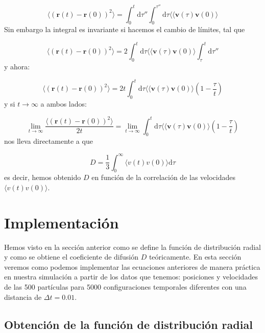 \documentclass[11pt]{article} %
\newcommand{\parentesis}[1]{\left( #1  \right)}
\newcommand{\D}{\mathrm{d}}
\newcommand{\rn}{\mathbf{r}}
\newcommand{\vn}{\mathbf{v}}
\begin{document}
\begin{equation}
	\langle	(\rn(t)-\rn(0))^2 \rangle = \int_{0}^{t}\D \tau'' \int_{0}^{\tau''} \D \tau  \langle \langle	\vn(\tau) \vn(0) \rangle 
\end{equation}
Sin embargo la integral es invariante si hacemos el cambio de límites, tal que


\begin{equation}
	\langle	(\rn(t)-\rn(0))^2 \rangle = 2 \int_{0}^{t}\D \tau   \langle \langle	\vn(\tau) \vn(0) \rangle \int_{\tau}^{t} \D \tau''
\end{equation}
y ahora:

\begin{equation}
	\langle	(\rn(t)-\rn(0))^2 \rangle = 2t \int_{0}^{t}\D \tau   \langle \langle	\vn(\tau) \vn(0) \rangle \parentesis{1-\frac{\tau}{t}}
\end{equation}
y si $t\rightarrow\infty$ a ambos lados:

\begin{equation}
	\lim_{t\rightarrow\infty} \frac{ \langle	(\rn(t)-\rn(0))^2 \rangle}{2t} = \lim_{t\rightarrow\infty}   \int_{0}^{t}\D \tau   \langle \langle	\vn(\tau) \vn(0) \rangle \parentesis{1-\frac{\tau}{t}}
\end{equation}
nos lleva directamente a que

\begin{equation}
	D = \frac{1}{3} \int_0^\infty \langle v(t)v(0)\rangle \D \tau
\end{equation}
es decir, hemos obtenido $D$ en función de la correlación de las velocidades $\langle v(t)v(0)\rangle$.

\section{Implementación}

Hemos visto en la sección anterior como se define la función de distribución radial y como se obtiene el coeficiente de difusión $D$ teóricamente. En esta sección veremos como podemos implementar las ecuaciones anteriores de manera práctica en nuestra simulación a partir de los datos que tenemos: posiciones y velocidades de las 500 partículas para 5000 configuraciones temporales diferentes con una distancia de $\Delta t = 0.01$. 

\subsection{Obtención de la función de distribución radial}
\end{document}
